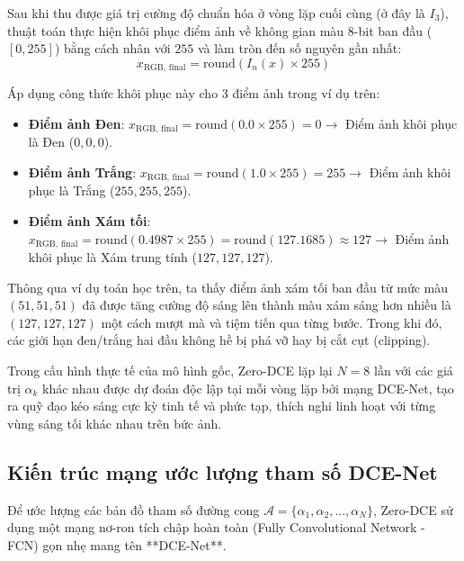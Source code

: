 \documentclass[a4paper]{article}
\begin{document}
Sau khi thu được giá trị cường độ chuẩn hóa ở vòng lặp cuối cùng (ở đây là $I_3$), thuật toán thực hiện khôi phục điểm ảnh về không gian màu 8-bit ban đầu ($[0, 255]$) bằng cách nhân với $255$ và làm tròn đến số nguyên gần nhất:
\begin{equation}
    x_{\text{RGB, final}} = \text{round}(I_n(x) \times 255)
\end{equation}

Áp dụng công thức khôi phục này cho 3 điểm ảnh trong ví dụ trên:
\begin{itemize}
    \item \textbf{Điểm ảnh Đen}: $x_{\text{RGB, final}} = \text{round}(0.0 \times 255) = 0 \rightarrow$ Điểm ảnh khôi phục là Đen ($0, 0, 0$).
    \item \textbf{Điểm ảnh Trắng}: $x_{\text{RGB, final}} = \text{round}(1.0 \times 255) = 255 \rightarrow$ Điểm ảnh khôi phục là Trắng ($255, 255, 255$).
    \item \textbf{Điểm ảnh Xám tối}: $x_{\text{RGB, final}} = \text{round}(0.4987 \times 255) = \text{round}(127.1685) \approx 127 \rightarrow$ Điểm ảnh khôi phục là Xám trung tính ($127, 127, 127$).
\end{itemize}

Thông qua ví dụ toán học trên, ta thấy điểm ảnh xám tối ban đầu từ mức màu $(51, 51, 51)$ đã được tăng cường độ sáng lên thành màu xám sáng hơn nhiều là $(127, 127, 127)$ một cách mượt mà và tiệm tiến qua từng bước. Trong khi đó, các giới hạn đen/trắng hai đầu không hề bị phá vỡ hay bị cắt cụt (clipping). 

Trong cấu hình thực tế của mô hình gốc, Zero-DCE lặp lại $N=8$ lần với các giá trị $\alpha_k$ khác nhau được dự đoán độc lập tại mỗi vòng lặp bởi mạng DCE-Net, tạo ra quỹ đạo kéo sáng cực kỳ tinh tế và phức tạp, thích nghi linh hoạt với từng vùng sáng tối khác nhau trên bức ảnh.

\subsection{Kiến trúc mạng ước lượng tham số DCE-Net}
Để ước lượng các bản đồ tham số đường cong $\mathcal{A} = \{\alpha_1, \alpha_2, ..., \alpha_N\}$, Zero-DCE sử dụng một mạng nơ-ron tích chập hoàn toàn (Fully Convolutional Network - FCN) gọn nhẹ mang tên **DCE-Net**.
\end{document}
